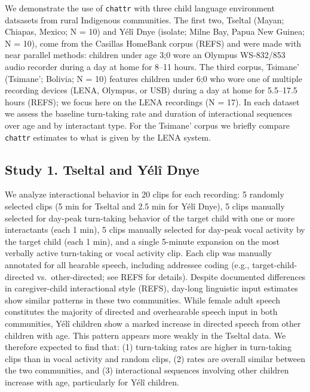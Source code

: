 \documentclass[10pt, letterpaper]{article}
\begin{document}
We demonstrate the use of \texttt{chattr} with three child language
environment datsasets from rural Indigenous communities. The first two,
Tseltal (Mayan; Chiapas, Mexico; N = 10) and Yélî Dnye (isolate; Milne
Bay, Papua New Guinea; N = 10), come from the Casillas HomeBank corpus
(REFS) and were made with near parallel methods: children under age 3;0
wore an Olympus WS-832/853 audio recorder during a day at home for 8--11
hours. The third corpus, Tsimane' (Tsimane'; Bolivia; N = 10) features
children under 6;0 who wore one of multiple recording devices (LENA,
Olympus, or USB) during a day at home for 5.5--17.5 hours (REFS); we
focus here on the LENA recordings (N = 17). In each dataset we assess
the baseline turn-taking rate and duration of interactional sequences
over age and by interactant type. For the Tsimane' corpus we briefly
compare \texttt{chattr} estimates to what is given by the LENA system.

\hypertarget{study-1.-tseltal-and-yuxe9luxee-dnye}{%
\subsection{Study 1. Tseltal and Yélî
Dnye}\label{study-1.-tseltal-and-yuxe9luxee-dnye}}

We analyze interactional behavior in 20 clips for each recording: 5
randomly selected clips (5 min for Tseltal and 2.5 min for Yélî Dnye), 5
clips manually selected for day-peak turn-taking behavior of the target
child with one or more interactants (each 1 min), 5 clips manually
selected for day-peak vocal activity by the target child (each 1 min),
and a single 5-minute expansion on the most verbally active turn-taking
or vocal activity clip. Each clip was manually annotated for all
hearable speech, including addressee coding (e.g., target-child-directed
vs.~other-directed; see REFS for details). Despite documented
differences in caregiver-child interactional style (REFS), day-long
linguistic input estimates show similar patterns in these two
communities. While female adult speech constitutes the majority of
directed and overhearable speech input in both communities, Yélî
children show a marked increase in directed speech from other children
with age. This pattern appears more weakly in the Tseltal data. We
therefore expected to find that: (1) turn-taking rates are higher in
turn-taking clips than in vocal activity and random clips, (2) rates are
overall similar between the two communities, and (3) interactional
sequences involving other children increase with age, particularly for
Yélî children.
\end{document}
